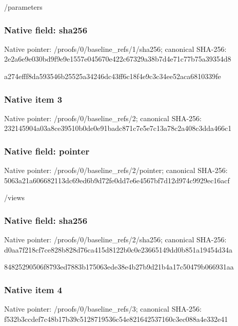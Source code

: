 \documentclass[10pt,a4paper]{article}
\begin{document}
\begingroup\raggedright\sloppy /\allowbreak{}parameters\par\endgroup

\subsubsection{Native field: sha256}
Native pointer: /proofs/0/baseline\_\allowbreak{}refs/1/sha256; canonical SHA-256: 2e2a6e9e030bd9f9e9e1557e045670e422c67329a38b7d4e71c77b75a39354d8

\begingroup\raggedright\sloppy a274efff8da593546b25525a34246dc43ff6c18f4e9c3c34ee52aca6810339fe\par\endgroup

\subsubsection{Native item 3}
Native pointer: /proofs/0/baseline\_\allowbreak{}refs/2; canonical SHA-256: 232145904a03a8ce39510b0de0e91badc871c7e5e7c13a78c2a408c3dda466c1

\subsubsection{Native field: pointer}
Native pointer: /proofs/0/baseline\_\allowbreak{}refs/2/pointer; canonical SHA-256: 5063a21a606682113dc69ed6b9d72fe0dd7e6e4567bf7d12d974c9929ec16acf

\begingroup\raggedright\sloppy /\allowbreak{}views\par\endgroup

\subsubsection{Native field: sha256}
Native pointer: /proofs/0/baseline\_\allowbreak{}refs/2/sha256; canonical SHA-256: d0aa7f218cf7ce828b828d76ca415d8122b0c0e23665149dd0b851a19454d34a

\begingroup\raggedright\sloppy 84825290506f8793ed7883b175063ede38e4b27b9d21b4a17c50479b066931aa\par\endgroup

\subsubsection{Native item 4}
Native pointer: /proofs/0/baseline\_\allowbreak{}refs/3; canonical SHA-256: f532b3ccdef7c48b17b39c5128719536c54e821642537160c3ec088a4e332e41
\end{document}
